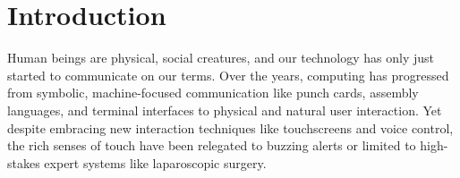 
\chapter{Introduction}
\label{ch:Introduction}
Human beings are physical, social creatures, and our technology has only just started to communicate on our terms.
Over the years, computing has progressed from symbolic, machine-focused communication like punch cards, assembly languages, and terminal interfaces to physical and natural user interaction.
Yet despite embracing new interaction techniques like touchscreens and voice control, the rich senses of touch have been relegated to buzzing alerts or limited to high-stakes expert systems like laparoscopic surgery.

